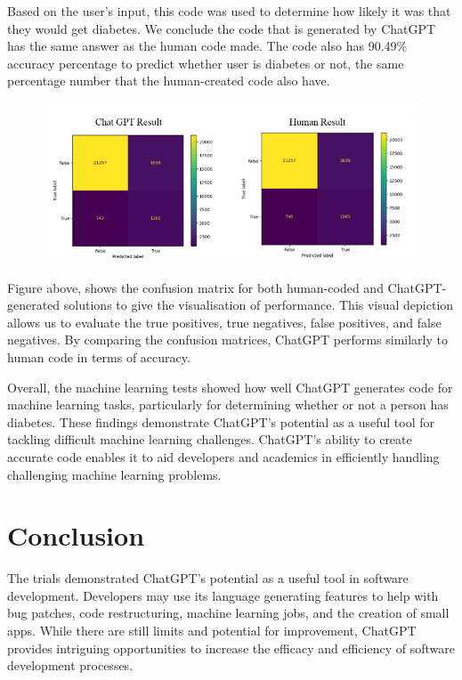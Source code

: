 \documentclass[conference]{IEEEtran}
\begin{document}
Based on the user's input, this code was used to determine how likely it was that they would get diabetes. We conclude the code that is generated by ChatGPT has the same answer as the human code made. The code also has 90.49\% accuracy percentage to predict whether user is diabetes or not, the same percentage number that the human-created code also have.

\begin{figure}[htbp]
\centerline{\includegraphics[width=1\linewidth]{Machine Learning/Diabetes.png}}
\caption{}
\label{simple app won}
\end{figure}

Figure above, shows the confusion matrix for both human-coded and ChatGPT-generated solutions to give the visualisation of performance. This visual depiction allows us to evaluate the true positives, true negatives, false positives, and false negatives. By comparing the confusion matrices, ChatGPT performs similarly to human code in terms of accuracy.

Overall, the machine learning tests showed how well ChatGPT generates code for machine learning tasks, particularly for determining whether or not a person has diabetes. These findings demonstrate ChatGPT's potential as a useful tool for tackling difficult machine learning challenges. ChatGPT's ability to create accurate code enables it to aid developers and academics in efficiently handling challenging machine learning problems.

\section{Conclusion}

The trials demonstrated ChatGPT's potential as a useful tool in software development. Developers may use its language generating features to help with bug patches, code restructuring, machine learning jobs, and the creation of small apps. While there are still limits and potential for improvement, ChatGPT provides intriguing opportunities to increase the efficacy and efficiency of software development processes.
\end{document}
